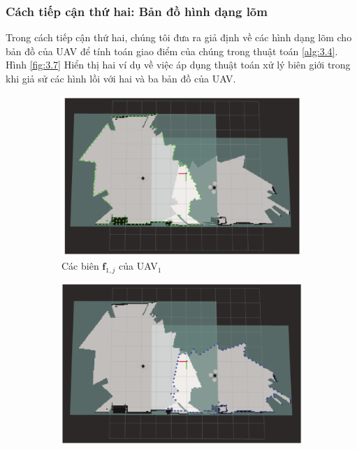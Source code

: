 \documentclass[11pt,openany]{book}
\begin{document}
\subsubsection{Cách tiếp cận thứ hai: Bản đồ hình dạng lõm}
Trong cách tiếp cận thứ hai, chúng tôi đưa ra giả định về các hình dạng lõm cho bản đồ của UAV để tính toán giao điểm của chúng trong thuật toán \ref{alg:3.4}. Hình \ref{fig:3.7} Hiển thị hai ví dụ về việc áp dụng thuật toán xử lý biên giới trong khi giả sử các hình lồi với hai và ba bản đồ của UAV.
\begin{figure}[H]
    \centering
    \begin{subfigure}[H]{0.6\linewidth}
        \centering
        \includegraphics[width=\linewidth]{assets/3_5_a.png}
        \caption{{Các biên $\mathbf{f}_{1,j}$ của UAV$_1$}}
        \label{fig:3.5a}
    \end{subfigure}
    \begin{subfigure}[H]{0.6\linewidth}
        \centering
        \includegraphics[width=\linewidth]{assets/3_5_b.png}

\end{subfigure}
\end{figure}
\end{document}
